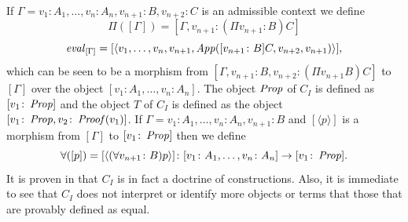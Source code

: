 If $\Gamma = v_1 \colon A_1, \dots, v_n \colon A_n, v_{n+1} \colon B, v_{n+2} \colon C$ is an admissible context
we define 
\[
    \Pi([\Gamma]) = [\Gamma, v_{n+1} \colon (\Pi v_{n+1} \colon B) C]
\]
\[
    \operatorname{\mathit{eval}}_{[\Gamma]} = [\langle v_1, \dots, v_n, v_{n+1}, \operatorname{\mathit{App}}([v_{n+1} \colon B]C, v_{n+2}, v_{n+1})\rangle],
\]
which can be seen to be a morphism from $[\Gamma, v_{n+1} \colon B, v_{n+2} \colon (\Pi v_{n+1} B) C]$ to $[\Gamma]$
over the object $[v_1 \colon A_1, \dots, v_n \colon A_n]$.
The object $\operatorname{\mathit{Prop}}$ of $C_I$ is defined as $[v_1 \colon \operatorname{\mathit{Prop}}]$ and the object $T$ of $C_I$ is defined as the object
$[v_1 \colon \operatorname{\mathit{Prop}}, v_2 \colon \operatorname{\mathit{Proof}}(v_1)]$.
If $\Gamma = v_1 \colon A_1, \dots, v_n \colon A_n, v_{n+1} \colon B$ and $[\langle p \rangle]$ is a morphism 
from $[\Gamma]$ to $[v_1 \colon \operatorname{\mathit{Prop}}]$ then we define
\[
    \forall([p]) = [\langle (\forall v_{n+1} \colon B) p \rangle] 
        \colon [v_1 \colon A_1, \dots, v_n \colon A_n] 
        \to [v_1 \colon \operatorname{\mathit{Prop}}].
\]
It is proven in \cite{streicher} that $C_I$ is in fact a doctrine of constructions. Also, it is immediate to see
that $C_I$ does not interpret or identify more objects or terms that those that are provably defined as equal.

